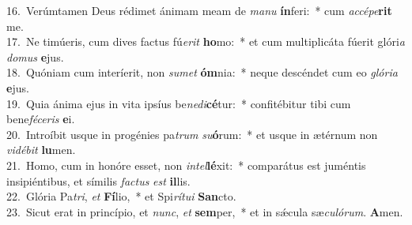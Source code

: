 {16.~}Verúmtamen Deus rédimet ánimam meam de \textit{ma}\textit{nu} \textbf{ín}feri:~* cum \textit{ac}\textit{cé}\textit{pe}\textbf{rit} me.\\
{17.~}Ne timúeris, cum dives factus fú\textit{e}\textit{rit} \textbf{ho}mo:~* et cum multiplicáta fúerit glóri\textit{a} \textit{do}\textit{mus} \textbf{e}jus.\\
{18.~}Quóniam cum interíerit, non \textit{su}\textit{met} \textbf{óm}nia:~* neque descéndet cum eo \textit{gló}\textit{ri}\textit{a} \textbf{e}jus.\\
{19.~}Quia ánima ejus in vita ipsíus be\textit{ne}\textit{di}\textbf{cé}tur:~* confitébitur tibi cum bene\textit{fé}\textit{ce}\textit{ris} \textbf{e}i.\\
{20.~}Introíbit usque in progénies pa\textit{trum} \textit{su}\textbf{ó}rum:~* et usque in ætérnum non \textit{vi}\textit{dé}\textit{bit} \textbf{lu}men.\\
{21.~}Homo, cum in honóre esset, non \textit{in}\textit{tel}\textbf{lé}xit:~* comparátus est juméntis insipiéntibus, et símilis \textit{fa}\textit{ctus} \textit{est} \textbf{il}lis.\\
{22.~}Glória Pa\textit{tri}, \textit{et} \textbf{Fí}lio,~* et Spi\textit{rí}\textit{tu}\textit{i} \textbf{San}cto.\\
{23.~}Sicut erat in princípio, et \textit{nunc}, \textit{et} \textbf{sem}per,~* et in sǽcula sæ\textit{cu}\textit{ló}\textit{rum}. \textbf{A}men.\\
